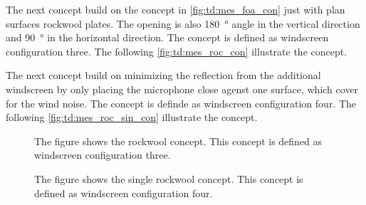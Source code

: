 The next concept build on the concept in \autoref{fig:td:mes_foa_con} just with plan surfaces rockwool plates. The opening is also \SI{180}{\degree} angle in the vertical direction and \SI{90}{\degree} in the horizontal direction. The concept is defined as windscreen configuration three. The following \autoref{fig:td:mes_roc_con} illustrate the concept.

The next concept build on minimizing the reflection from the additional windscreen by only placing the microphone close agenst one surface, which cover for the wind noise. The concept is definde as windscreen configuration four. The following \autoref{fig:td:mes_roc_sin_con} illustrate the concept.



\begin{figure}[H]
    \centering
     \captionsetup{width=1\linewidth}
    \begin{minipage}{0.46\textwidth}
         \captionsetup{width=0.90\linewidth}
       
        \caption{The figure shows the rockwool concept. This concept is defined as windscreen configuration three.}
        \label{fig:td:mes_roc_con}
    \end{minipage}%
    \begin{minipage}{0.46\textwidth}
        \centering
         \captionsetup{width=0.90\linewidth}
        
        \caption{The figure shows the single rockwool concept. This concept is defined as windscreen configuration four.}
        \label{fig:td:mes_roc_sin_con}
    \end{minipage}
\end{figure}


 

